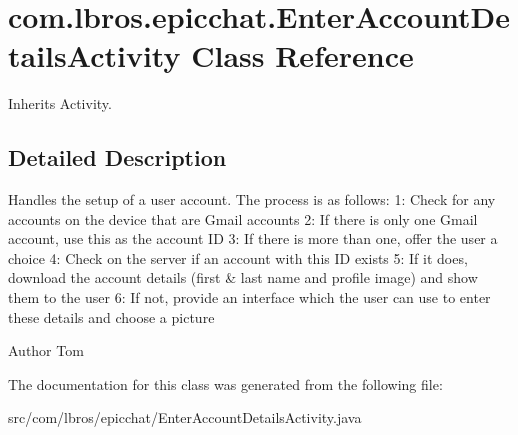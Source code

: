 \hypertarget{classcom_1_1lbros_1_1epicchat_1_1_enter_account_details_activity}{\section{com.\-lbros.\-epicchat.\-Enter\-Account\-Details\-Activity Class Reference}
\label{classcom_1_1lbros_1_1epicchat_1_1_enter_account_details_activity}
}


Inherits Activity.



\subsection{Detailed Description}
Handles the setup of a user account. The process is as follows\-: 1\-: Check for any accounts on the device that are Gmail accounts 2\-: If there is only one Gmail account, use this as the account I\-D 3\-: If there is more than one, offer the user a choice 4\-: Check on the server if an account with this I\-D exists 5\-: If it does, download the account details (first \& last name and profile image) and show them to the user 6\-: If not, provide an interface which the user can use to enter these details and choose a picture \begin{DoxyAuthor}{Author}
Tom 
\end{DoxyAuthor}


The documentation for this class was generated from the following file\-:\begin{DoxyCompactItemize}
\item 
src/com/lbros/epicchat/Enter\-Account\-Details\-Activity.\-java\end{DoxyCompactItemize}

